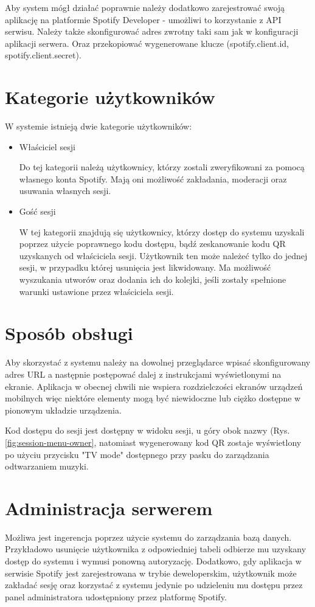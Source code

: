 Aby system mógł działać poprawnie należy dodatkowo zarejestrować swoją aplikację na platformie Spotify Developer \cite{bib:spotify_api} - umożliwi to korzystanie z API serwisu. Należy także skonfigurować adres zwrotny taki sam jak w konfiguracji aplikacji serwera. Oraz przekopiować wygenerowane klucze (spotify.client.id, spotify.client.secret).

\section{Kategorie użytkowników}
W systemie istnieją dwie kategorie użytkowników:
\begin{itemize}
\item Właściciel sesji

Do tej kategorii należą użytkownicy, którzy zostali zweryfikowani za pomocą własnego konta Spotify. Mają oni możliwość zakładania, moderacji oraz usuwania własnych sesji.

\item Gość sesji

W tej kategorii znajdują się użytkownicy, którzy dostęp do systemu uzyskali poprzez użycie poprawnego kodu dostępu, bądź zeskanowanie kodu QR uzyskanych od właściciela sesji. Użytkownik ten może należeć tylko do jednej sesji, w przypadku której usunięcia jest likwidowany. Ma możliwość wyszukania utworów oraz dodania ich do kolejki, jeśli zostały spełnione warunki ustawione przez właściciela sesji.

\end{itemize}
\section{Sposób obsługi}
Aby skorzystać z systemu należy na dowolnej przeglądarce wpisać skonfigurowany adres URL a następnie postępować dalej z instrukcjami wyświetlonymi na ekranie. Aplikacja w obecnej chwili nie wspiera rozdzielczości ekranów urządzeń mobilnych więc niektóre elementy mogą być niewidoczne lub ciężko dostępne w pionowym układzie urządzenia.

Kod dostępu do sesji jest dostępny w widoku sesji, u góry obok nazwy (Rys. \ref{fig:session-menu-owner}, natomiast wygenerowany kod QR zostaje wyświetlony po użyciu przycisku "TV mode" dostępnego przy pasku do zarządzania odtwarzaniem muzyki.

\section{Administracja serwerem}
Możliwa jest ingerencja poprzez użycie systemu do zarządzania bazą danych. Przykładowo usunięcie użytkownika z odpowiedniej tabeli odbierze mu uzyskany dostęp do systemu i wymusi ponowną autoryzację. Dodatkowo, gdy aplikacja w serwisie Spotify jest zarejestrowana w trybie deweloperskim, użytkownik może zakładać sesję oraz korzystać z systemu jedynie po udzieleniu mu dostępu przez panel administratora udostępniony przez platformę Spotify.

